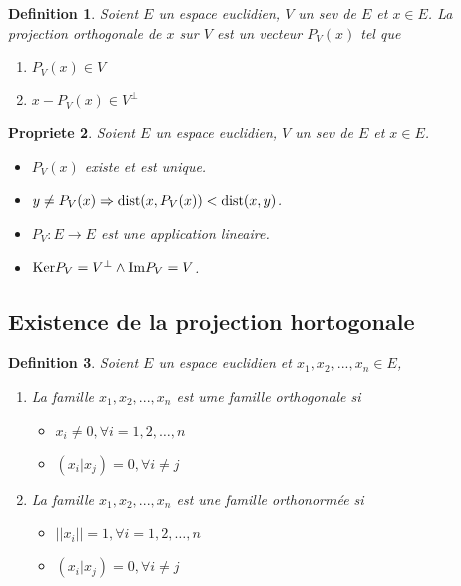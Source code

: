 \documentclass[11pt,a4paper]{article} %
\newtheorem{defin}{Definition}[section]
\newtheorem{prop}[defin]{Propriete}
\begin{document}
\begin{defin}
	Soient $E$ un espace euclidien, $V$ un sev de $E$ et $x \in E$.
	La projection orthogonale de $x$ sur $V$ est un vecteur $P_V(x)$ tel que
	\begin{enumerate}
		\item $P_V(x) \in V$
		\item $x - P_V(x) \in V^{\perp}$
	\end{enumerate}
\end{defin}

\begin{prop}
	Soient $E$ un espace euclidien, $V$ un sev de $E$ et $x \in E$.
	\begin{itemize}
		\item $P_V(x)$ existe et est unique.
		\item $y \neq P_V(x) \Rightarrow \mathrm{dist}(x, P_V(x)) < \mathrm{dist}(x, y)$.
		\item $P_V : E \to E$ est une application lineaire.
		\item $\mathrm{Ker} P_V = V^{\perp} \land \mathrm{Im} P_V = V$.
	\end{itemize}
\end{prop}


\subsection{Existence de la projection hortogonale}
\begin{defin}
  Soient $E$ un espace euclidien et $x_1, x_2,... ,x_n \in E$,
  \begin{enumerate}
  \item La famille $x_1, x_2,... ,x_n$ est ume famille orthogonale si
    \begin{itemize}
    \item $x_i \neq 0, \forall i = 1, 2, \ldots, n$
    \item $(x_i|x_j) = 0, \forall i \neq j$
    \end{itemize}

  \item La famille $x_1, x_2,... ,x_n$ est une famille orthonormée si
    \begin{itemize}
    \item $||x_i|| = 1, \forall i = 1, 2, \ldots, n$
    \item $(x_i|x_j) = 0, \forall i \neq j$
    \end{itemize}
  \end{enumerate}
\end{defin}
\end{document}
